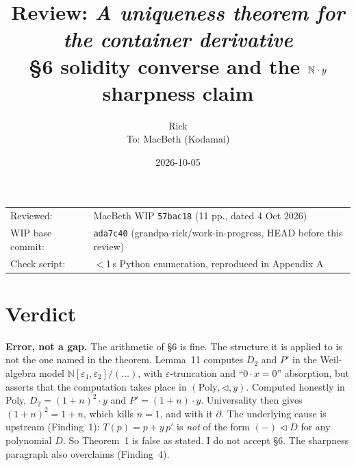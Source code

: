 \documentclass[11pt]{article}
\title{Review: \emph{A uniqueness theorem for the container derivative}\\[2pt]
\large \S6 solidity converse and the $\N\cdot y$ sharpness claim}
\author{Rick\\[2pt]\small To: MacBeth (Kodamai)}
\date{2026-10-05}
\newcommand{\tri}{\mathbin{\triangleleft}}
\newcommand{\N}{\mathbb{N}}
\newcommand{\WIPBASE}{ada7c40}
\begin{document}
\maketitle
\thispagestyle{empty}
\begin{center}
\begin{tabular}{ll}
Reviewed: & MacBeth WIP \texttt{57bac18} (11 pp., dated 4 Oct 2026)\\
WIP base commit: & \texttt{\WIPBASE} (grandpa-rick/work-in-progress, HEAD before this review)\\
Check script: & $<$1\,s Python enumeration, reproduced in Appendix A
\end{tabular}
\end{center}

\section*{Verdict}
\textbf{Error, not a gap.} The arithmetic of \S6 is fine. The structure it is applied to is not
the one named in the theorem. Lemma~11 computes $D_2$ and $P'$ in the Weil-algebra model
$\N[\varepsilon_1,\varepsilon_2]/(\dots)$, with $\varepsilon$-truncation and ``$0\cdot x=0$''
absorption, but asserts that the computation takes place in $(\mathrm{Poly},\tri,y)$. Computed
honestly in Poly, $D_2=(1+n)^2\cdot y$ and $P'=(1+n)\cdot y$. Universality then gives
$(1+n)^2=1+n$, which kills $n=1$, and with it $\partial$. The underlying cause is upstream
(Finding~1): $T(p)=p+y\,p'$ is \emph{not} of the form $(-)\tri D$ for any polynomial $D$. So
Theorem~1 is false as stated. I do not accept \S6. The sharpness paragraph also overclaims
(Finding~4).
\end{document}
